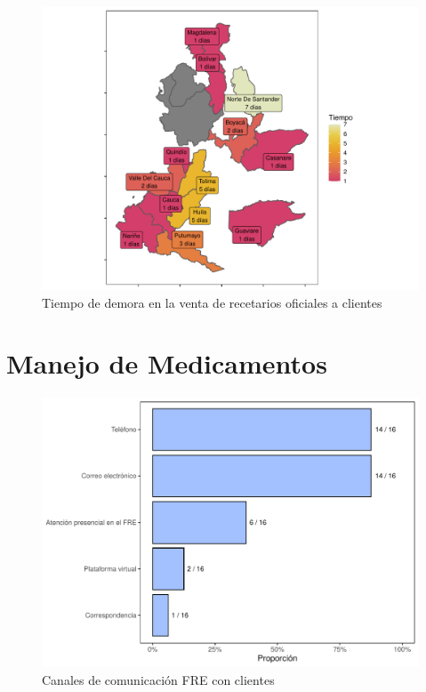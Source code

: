 \documentclass[
]{book}
\begin{document}
\begin{figure}
\includegraphics[width=0.9\linewidth]{InformeFinal_files/figure-latex/TiempoVentaInstituciones-1} \caption{Tiempo de demora en la venta de recetarios oficiales a clientes}\label{fig:TiempoVentaInstituciones}
\end{figure}

\hypertarget{manejo-de-medicamentos}{%
\chapter{Manejo de Medicamentos}\label{manejo-de-medicamentos}}


\begin{figure}
\includegraphics[width=0.85\linewidth]{InformeFinal_files/figure-latex/MediosComunicacion-1} \caption{Canales de comunicación FRE con clientes}\label{fig:MediosComunicacion}
\end{figure}
\end{document}
